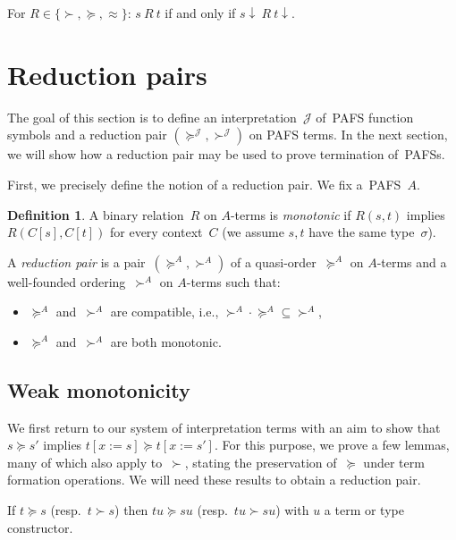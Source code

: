 \documentclass[a4paper,UKenglish,cleveref,autoref,numberwithinsect]{lipics-v2019}
\theoremstyle{definition}
\newtheorem{defn}[theorem]{Definition}
\newcommand{\subst}[2]{#1:=#2}
\newcommand{\Termmap}{\mathcal{J}}
\newcommand{\succinterpret}{\succ^{\Termmap}}
\newcommand{\succeqinterpret}{\succeq^{\Termmap}}
\begin{document}
\begin{corollary}\label{cor_succ_da}
  For $R \in \{\succ,\succeq,\approx\}$: $s\ R\ t$ if and only if
  $s\downarrow\ R\ t\downarrow$.
\end{corollary}


\section{Reduction pairs}\label{sec_reduction_pairs}

The goal of this section is to define an interpretation~$\Termmap$
of~PAFS function symbols and a reduction pair
$(\succeqinterpret,\succinterpret)$ on PAFS terms. In the next
section, we will show how a reduction pair may be used to prove
termination of~PAFSs.

First, we precisely define the notion of a reduction pair. We fix
a~PAFS~$A$.

\begin{defn}
  A binary relation~$R$ on $A$-terms is \emph{monotonic} if $R(s, t)$
  implies $R(C[s], C[t])$ for every context~$C$ (we assume $s,t$ have
  the same type~$\sigma$).

  A \emph{reduction pair} is a pair~$(\succeq^A,\succ^A)$ of a
  quasi-order~$\succeq^A$ on $A$-terms and a well-founded
  ordering~$\succ^A$ on $A$-terms such that:
  \begin{itemize}
  \item $\succeq^A$ and~$\succ^A$ are compatible, i.e., ${\succ^A}
    \cdot {\succeq^A} \subseteq {\succ^A}$,
  \item $\succeq^A$ and~$\succ^A$ are both monotonic.
  \end{itemize}
\end{defn}

\subsection{Weak monotonicity}

We first return to our system of interpretation terms with an aim to
show that $s \succeq s'$ implies $t[\subst{x}{s}] \succeq
t[\subst{x}{s'}]$. For this purpose, we prove a few lemmas, many of
which also apply to~$\succ$, stating the preservation of~$\succeq$
under term formation operations. We will need these results to obtain
a reduction pair.

\begin{lemma}\label{lem_app_succ}
  If $t \succeq s$ (resp.~$t \succ s$) then $t u \succeq s u$
  (resp.~$t u \succ s u$) with $u$ a term or type constructor.
\end{lemma}
\end{document}
